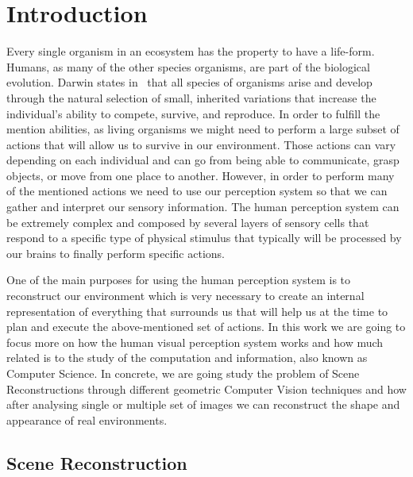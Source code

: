 \graphicspath{{./main/2_introduction/figures/}}

\chapter{Introduction}
\label{chap:intro}

Every single organism in an ecosystem has the property to have a life-form. Humans, as many of the other species organisms, are part of the biological evolution. Darwin states in~\citep{darwin1859} that all species of organisms arise and develop through the natural selection of small, inherited variations that increase the individual's ability to compete, survive, and reproduce. In order to fulfill the mention abilities, as living organisms we might need to perform a large subset of actions that will allow us to survive in our environment. Those actions can vary depending on each individual and can go from being able to communicate, grasp objects, or move from one place to another. However, in order to perform many of the mentioned actions we need to use our perception system so that we can gather and interpret our sensory information. The human perception system can be extremely complex and composed by several layers of sensory cells that respond to a specific type of physical stimulus that typically will be processed by our brains to finally perform specific actions.

One of the main purposes for using the human perception system is to reconstruct our environment which is very necessary to create an internal representation of everything that surrounds us that will help us at the time to plan and execute the above-mentioned set of actions. In this work we are going to focus more on how the human visual perception system works and how much related is to the study of the computation and information, also known as Computer Science. In concrete, we are going study the problem of Scene Reconstructions through different geometric Computer Vision techniques and how after analysing single or multiple set of images we can reconstruct the shape and appearance of real environments.

\section{Scene Reconstruction}

